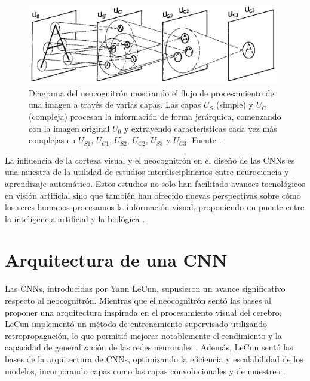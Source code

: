 \begin{figure}[h]
	\centering
	\includegraphics[width=110mm]{img/neocognitron.png}
	\caption{Diagrama del neocognitrón mostrando el flujo de procesamiento de una
		imagen a través de varias capas. Las capas $U_{S}$ (simple) y $U_{C}$ (compleja)
		procesan la información de forma jerárquica, comenzando con la imagen original
		$U_{0}$ y extrayendo características cada vez más complejas en $U_{S1}$, $U_{C1}$,
		$U_{S2}$, $U_{C2}$, $U_{S3}$ y $U_{C3}$. Fuente \cite{fukushima1980neocognitron}.}
	\label{fig:neocognitron}
\end{figure}

La influencia de la corteza visual y el neocognitrón en el diseño de las CNNs es
una muestra de la utilidad de estudios interdisciplinarios entre neurociencia y
aprendizaje automático. Estos estudios no solo han facilitado avances tecnológicos
en visión artificial sino que también han ofrecido nuevas perspectivas sobre cómo
los seres humanos procesamos la información visual, proponiendo un puente entre
la inteligencia artificial y la biológica \cite{serre2007feedforward}.

\section{Arquitectura de una CNN}

Las CNNs, introducidas por Yann LeCun, supusieron un avance significativo respecto
al neocognitrón. Mientras que el neocognitrón sentó las bases al proponer una
arquitectura inspirada en el procesamiento visual del cerebro, LeCun implementó un
método de entrenamiento supervisado utilizando retropropagación, lo que permitió
mejorar notablemente el rendimiento y la capacidad de generalización de las
redes neuronales \cite{lecun1998gradient}. Además, LeCun sentó las bases de la
arquitectura de CNNs, optimizando la eficiencia y escalabilidad de los modelos,
incorporando capas como las capas convolucionales y de muestreo
\cite{lecun1989backpropagation}.

